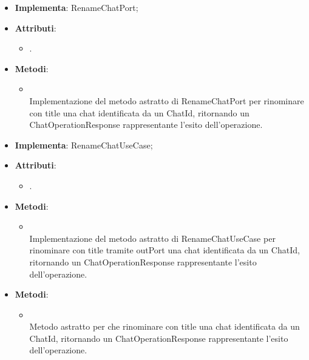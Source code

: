 \documentclass[10pt, a4paper]{article}
\begin{document}
\label{RenameChatPostgresDettaglio}
\begin{itemize}
    \item \textbf{Implementa}: RenameChatPort;
    \item \textbf{Attributi}:
    \begin{itemize}
        \item {}.
    \end{itemize}
    \item \textbf{Metodi}:
    \begin{itemize}
        \item {}\\
        Implementazione del metodo astratto di RenameChatPort per rinominare con title una chat identificata da un ChatId, ritornando un ChatOperationResponse rappresentante l'esito dell'operazione.
    \end{itemize}
\end{itemize}



\label{RenameChatServiceDettaglio}
\begin{itemize}
    \item \textbf{Implementa}: RenameChatUseCase;
    \item \textbf{Attributi}:
    \begin{itemize}
        \item {}.
    \end{itemize}
    \item \textbf{Metodi}:
    \begin{itemize}
        \item {}\\
        Implementazione del metodo astratto di RenameChatUseCase per rinominare con title tramite outPort una chat identificata da un ChatId, ritornando un ChatOperationResponse rappresentante l'esito dell'operazione.
    \end{itemize}
\end{itemize}

\label{RenameChatUseCaseDettaglio}
\begin{itemize}
    \item \textbf{Metodi}:
    \begin{itemize}
        \item {}\\
        Metodo astratto per che rinominare con title una chat identificata da un ChatId, ritornando un ChatOperationResponse rappresentante l'esito dell'operazione.
    \end{itemize}
\end{itemize}
\end{document}

